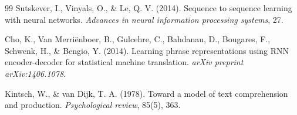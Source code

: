 \begin{thebibliography}{99}
Sutskever, I., Vinyals, O., \& Le, Q. V. (2014). Sequence to sequence learning with neural networks. \textit{Advances in neural information processing systems}, 27.

Cho, K., Van Merriënboer, B., Gulcehre, C., Bahdanau, D., Bougares, F., Schwenk, H., \& Bengio, Y. (2014). Learning phrase representations using RNN encoder-decoder for statistical machine translation. \textit{arXiv preprint arXiv:1406.1078}.

Kintsch, W., \& van Dijk, T. A. (1978). Toward a model of text comprehension and production. \textit{Psychological review}, 85(5), 363.

\end{thebibliography}

